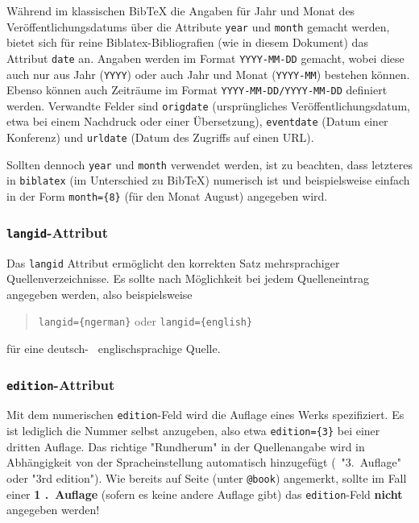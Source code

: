 Während im klassischen BibTeX die Angaben für Jahr und Monat des
Veröffentlichungsdatums über die Attribute \texttt{year} und \texttt{month}
gemacht werden, bietet sich für reine Biblatex-Bibliografien (wie in diesem
Dokument) das Attribut \texttt{date} an. Angaben werden im Format
\texttt{YYYY-MM-DD} gemacht, wobei diese auch nur aus Jahr (\texttt{YYYY})
oder auch Jahr und Monat (\texttt{YYYY-MM}) bestehen können. Ebenso können
auch Zeiträume im Format \texttt{YYYY-MM-DD/YYYY-MM-DD} definiert werden.
Verwandte Felder sind \texttt{origdate} (ursprüngliches
Veröffentlichungsdatum, etwa bei einem Nachdruck oder einer Übersetzung),
\texttt{eventdate} (Datum einer Konferenz) und \texttt{urldate} (Datum des
Zugriffs auf einen URL).

Sollten dennoch \texttt{year} und \texttt{month} verwendet werden, ist zu
beachten, dass letzteres in \texttt{biblatex} (im Unterschied zu BibTeX)
numerisch ist und beispielsweise einfach in der Form \verb!month={8}! (für
den Monat August) angegeben wird.


\subsubsection{\texttt{langid}-Attribut}

Das \texttt{langid} Attribut ermöglicht den korrekten Satz mehrsprachiger
Quellenverzeichnisse. Es sollte nach Möglichkeit bei jedem Quelleneintrag
angegeben werden, also beispielsweise
%
\begin{quote}
\verb!langid={ngerman}! \quad oder \quad \verb!langid={english}!
\end{quote}
%
für eine deutsch- \bzw\ englischsprachige Quelle.


\subsubsection{\texttt{edition}-Attribut}

Mit dem numerischen \texttt{edition}-Feld wird die Auflage eines Werks
spezifiziert. Es ist lediglich die Nummer selbst anzugeben, also etwa
\verb!edition={3}! bei einer dritten Auflage. Das richtige "Rundherum" in der
Quellenangabe wird in Abhängigkeit von der Spracheinstellung automatisch
hinzugefügt (\zB\ "3.\ Auflage" oder "3rd edition"). Wie bereits auf Seite
\pageref{sec:@book} (unter \texttt{@book}) angemerkt, sollte im Fall einer
\textbf{1 .~Auflage} (sofern es keine andere Auflage gibt) das
\texttt{edition}-Feld \textbf{nicht} angegeben werden!


